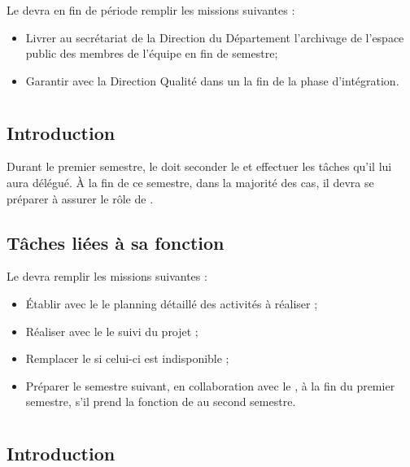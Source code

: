 Le \CP{} devra en fin de période remplir les missions suivantes :
\begin{itemize}
	\item Livrer au secrétariat de la Direction du Département \ASICourt{} l’archivage de l’espace public des membres de l’équipe en fin de semestre;
	\item Garantir avec la Direction Qualité dans un \PVCourt{} la fin de la phase d’intégration.
\end{itemize}
\newpage

\section{\CPA}
\subsection*{Introduction}


Durant le premier semestre, le \CPA{} doit seconder le \CP{} et effectuer les tâches qu’il lui aura délégué. À la fin de ce semestre, dans la majorité des cas, il devra se préparer à assurer le rôle de \CP.


\subsection*{Tâches liées à sa fonction}

Le \CPA{} devra remplir les missions suivantes :
\begin{itemize}
	\item Établir avec le \CP{} le planning détaillé des activités à réaliser ;
	\item Réaliser avec le \CP{} le suivi du projet ;
	\item Remplacer le \CP{} si celui-ci est indisponible ;

	\item Préparer le semestre suivant, en collaboration avec le \CP{}, à la fin du premier semestre, s’il prend la fonction de \CP{} au second semestre.

\end{itemize}

\newpage
\section{\RQ}
\subsection*{Introduction}

